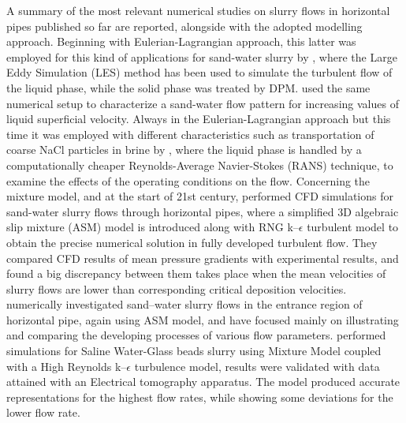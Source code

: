 \documentclass[11pt]{report}
\begin{document}
A summary of the most relevant numerical studies on slurry flows in horizontal pipes published so far are reported, alongside with the adopted modelling approach. Beginning with Eulerian-Lagrangian approach, this latter was employed for this kind of applications for sand-water slurry by \citet{Capecelatro-2013}, where the Large Eddy Simulation (LES) method \citet{versteeg2007introduction} has been used to simulate the turbulent flow of the liquid phase, while the solid phase was treated by DPM.  \citet{AROLLA20151} used the same numerical setup to characterize a sand-water flow pattern for increasing values of liquid superficial velocity.  Always in the Eulerian-Lagrangian approach but this time it was employed with different characteristics such as transportation of coarse NaCl particles in brine by \citet{Uzi-2017}, where the liquid phase is handled by a computationally cheaper Reynolds-Average Navier-Stokes (RANS) technique, to examine the effects of the operating conditions on the flow. Concerning the mixture model, and at the start of 21st century, \citet{J-2003} performed CFD simulations for sand-water slurry flows through horizontal pipes, where a simplified 3D algebraic slip mixture (ASM) model is introduced along with RNG k–$\epsilon$ turbulent model to obtain the precise numerical solution in fully developed turbulent flow. They compared CFD results of mean pressure gradients with experimental results, and found a big discrepancy between them takes place when the mean velocities of slurry flows are lower than corresponding critical deposition velocities. \citet{C.X-2008} numerically investigated sand–water slurry flows in the entrance region of horizontal pipe, again using ASM model, and have focused mainly on illustrating and comparing the developing processes of various flow parameters. \citet{Silva-2016} performed simulations for Saline Water-Glass beads slurry using Mixture Model coupled with a High Reynolds k–$\epsilon$ turbulence model, results were validated with data attained with an Electrical tomography apparatus. The model produced accurate representations for the highest flow rates, while showing some deviations for the lower flow rate.
\end{document}

